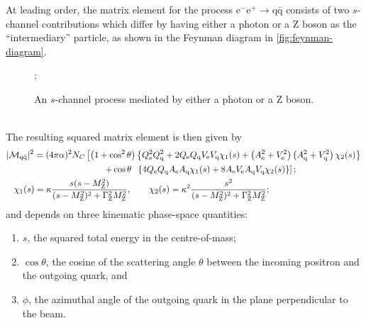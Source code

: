 At leading order, the matrix element for the process $\mathrm{e}^{-} \mathrm{e}^{+} \to \mathrm{q} \bar{\mathrm{q}}$ consists of two $s$-channel contributions which differ by having either a photon or a Z boson as the “intermediary” particle, as shown in the Feynman diagram in \autoref{fig:feynman-diagram}.
\begin{figure}[ht!]
    \centering
    ;
    \caption{An $s$-channel process mediated by either a photon or a Z boson.}
    \label{fig:feynman-diagram}
\end{figure} \\
The resulting squared matrix element is then given by
\begin{align}
    &
    \begin{aligned}
    \lvert \mathcal{M}_{\mathrm{q} \bar{\mathrm{q}}} \rvert^{2} = (4 \pi \alpha)^{2} N_{C} & \left[
    \left( 1 + \cos^{2}{\theta} \right) \left\{ Q_{\mathrm{e}}^{2} Q_{\mathrm{q}}^{2} + 2 Q_{\mathrm{e}} Q_{\mathrm{q}} V_{\mathrm{e}} V_{\mathrm{q}} \chi_{1}(s) + \left( A_{\mathrm{e}}^{2} + V_{\mathrm{e}}^{2} \right) \left( A_{\mathrm{q}}^{2} + V_{\mathrm{q}}^{2} \right) \chi_{2}(s) \right\}
    \right. \\
    & \left. \qquad + \cos{\theta} \hspace{2mm} \left\{ 4 Q_{\mathrm{e}} Q_{\mathrm{q}} A_{\mathrm{e}} A_{\mathrm{q}} \chi_{1}(s) + 8 A_{\mathrm{e}} V_{\mathrm{e}} A_{\mathrm{q}} V_{\mathrm{q}} \chi_{2}(s) \right\} \right];
    \end{aligned} \label{eq:1-sqr-mat-element} \\
    & \hspace{3mm} \chi_{1}(s) = \kappa \frac{s(s - M_{\text{Z}}^{2})}{(s - M_{\text{Z}}^{2})^{2} + \Gamma^{2}_{\text{Z}} M_{\text{Z}}^{2}}, \qquad \chi_{2}(s) = \kappa^{2} \frac{s^{2}}{(s - M_{\text{Z}}^{2})^{2} + \Gamma^{2}_{\text{Z}} M_{\text{Z}}^{2}}; \label{eq:1-chi-funcs}
\end{align}
and depends on three kinematic phase-space quantities: 
\begin{enumerate}[label=\roman*)]
    \item $s$, the squared total energy in the centre-of-mass;

    \item $\cos{\theta}$, the cosine of the scattering angle $\theta$ between the incoming positron and the outgoing quark, and

    \item $\phi$, the azimuthal angle of the outgoing quark in the plane perpendicular to the beam.
\end{enumerate}
